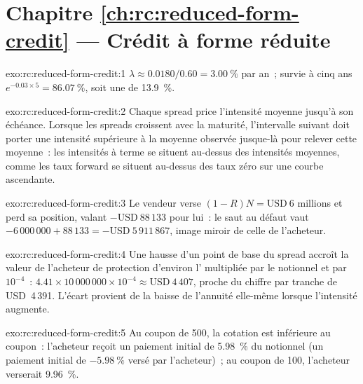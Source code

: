 \section*{Chapitre \ref{ch:rc:reduced-form-credit} --- Crédit à forme réduite}

\begin{solution}{exo:rc:reduced-form-credit:1}
$\lambda \approx 0.0180/0.60 = 3.00~\%$ par an~; survie à cinq ans $e^{-0.03\times5} = 86.07~\%$,
soit une  de 13.9~\%.
\end{solution}

\begin{solution}{exo:rc:reduced-form-credit:2}
Chaque spread price l'intensité moyenne jusqu'à son échéance. Lorsque les spreads croissent
avec la maturité, l'intervalle suivant doit porter une intensité supérieure à la moyenne observée jusque-là
pour relever cette moyenne~: les intensités à terme se situent au-dessus des intensités moyennes,
comme les taux forward se situent au-dessus des taux zéro sur une courbe ascendante.
\end{solution}

\begin{solution}{exo:rc:reduced-form-credit:3}
Le vendeur verse $(1-R)N = \text{USD}~6$ millions et perd sa position, valant
$-\text{USD}~88\,133$ pour lui~: le saut au défaut vaut $-6\,000\,000+88\,133 = -\text{USD}~5\,911\,867$,
image miroir de celle de l'acheteur.
\end{solution}

\begin{solution}{exo:rc:reduced-form-credit:4}
Une hausse d'un point de base du spread accroît la valeur de l'acheteur de protection d'environ
l' multipliée par le notionnel et par $10^{-4}$~: $4.41\times10\,000\,000\times10^{-4} \approx
\text{USD}~4\,407$, proche du chiffre par tranche de USD~4\,391. L'écart provient de la baisse
de l'annuité elle-même lorsque l'intensité augmente.
\end{solution}

\begin{solution}{exo:rc:reduced-form-credit:5}
Au coupon de 500, la cotation est inférieure au coupon~: l'acheteur reçoit un paiement initial de
5.98~\% du notionnel (un paiement initial de $-5.98~\%$ versé par l'acheteur)~; au coupon de 100,
l'acheteur verserait 9.96~\%.
\end{solution}

